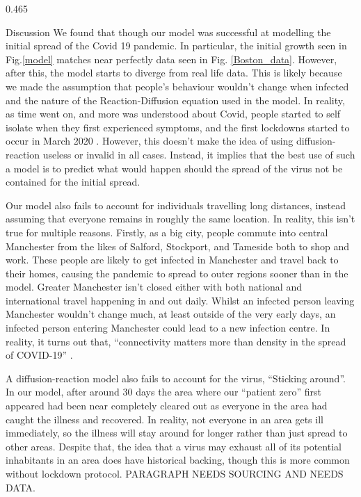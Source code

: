 \documentclass{beamer} %
\begin{document}
\begin{frame}[t]
\begin{columns}[t]
\begin{column}{0.465\textwidth}
\begin{block}{Discussion}
We found that though our model was successful at modelling the initial spread of the Covid 19 pandemic. In particular, the initial growth seen in Fig.\ref{model} matches near perfectly data seen in Fig. \ref{Boston_data}. However, after this, the model starts to diverge from real life data. This is likely because we made the assumption that people’s behaviour wouldn’t change when infected and the nature of the Reaction-Diffusion equation used in the model. In reality, as time went on, and more was understood about Covid, people started to self isolate when they first experienced symptoms, and the first lockdowns started to occur in March 2020 \cite{iog}. However, this doesn’t make the idea of using diffusion-reaction useless or invalid in all cases. Instead, it implies that the best use of such a model is to predict what would happen should the spread of the virus not be contained for the initial spread. 

\bigskip

Our model also fails to account for individuals travelling long distances, instead assuming that everyone remains in roughly the same location. In reality, this isn’t true for multiple reasons. Firstly, as a big city, people commute into central Manchester from the likes of Salford, Stockport, and Tameside both to shop and work. These people are likely to get infected in Manchester and travel back to their homes, causing the pandemic to spread to outer regions sooner than in the model. Greater Manchester isn’t closed either with both national and international travel happening in and out daily. Whilst an infected person leaving Manchester wouldn’t change much, at least outside of the very early days, an infected person entering Manchester could lead to a new infection centre. In reality, it turns out that, “connectivity matters more than density in the spread of COVID-19” \cite{HAMIDI2020102378}.

\bigskip

A diffusion-reaction model also fails to account for the virus, “Sticking around”. In our model, after around 30 days the area where our “patient zero” first appeared had been near completely cleared out as everyone in the area had caught the illness and recovered. In reality, not everyone in an area gets ill immediately, so the illness will stay around for longer rather than just spread to other areas. Despite that, the idea that a virus may exhaust all of its potential inhabitants in an area does have historical backing, though this is more common without lockdown protocol.
PARAGRAPH NEEDS SOURCING AND NEEDS DATA.


\end{block}
\end{column}
\end{columns}
\end{frame}
\end{document}
